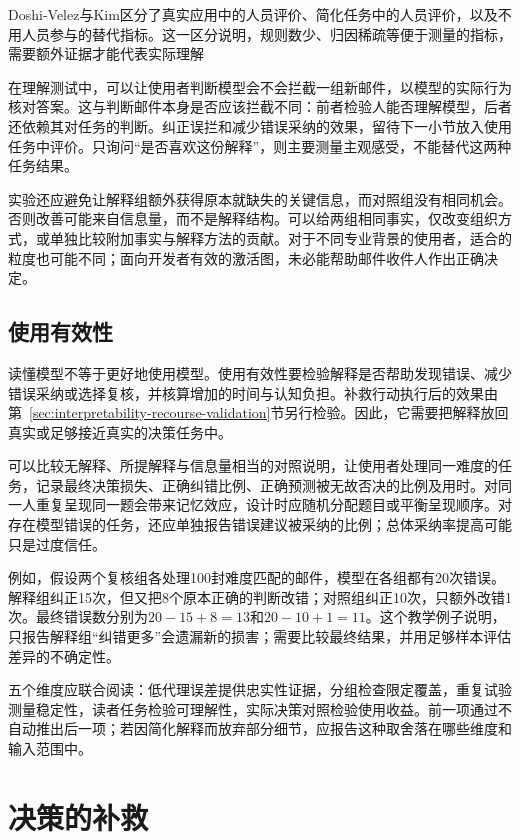 Doshi-Velez与Kim区分了真实应用中的人员评价、简化任务中的人员评价，以及不用人员参与的替代指标。这一区分说明，规则数少、归因稀疏等便于测量的指标，需要额外证据才能代表实际理解

在理解测试中，可以让使用者判断模型会不会拦截一组新邮件，以模型的实际行为核对答案。这与判断邮件本身是否应该拦截不同：前者检验人能否理解模型，后者还依赖其对任务的判断。纠正误拦和减少错误采纳的效果，留待下一小节放入使用任务中评价。只询问“是否喜欢这份解释”，则主要测量主观感受，不能替代这两种任务结果。

实验还应避免让解释组额外获得原本就缺失的关键信息，而对照组没有相同机会。否则改善可能来自信息量，而不是解释结构。可以给两组相同事实，仅改变组织方式，或单独比较附加事实与解释方法的贡献。对于不同专业背景的使用者，适合的粒度也可能不同；面向开发者有效的激活图，未必能帮助邮件收件人作出正确决定。

\subsection{使用有效性}
\label{sec:interpretability-quality-utility}

读懂模型不等于更好地使用模型。使用有效性要检验解释是否帮助发现错误、减少错误采纳或选择复核，并核算增加的时间与认知负担。补救行动执行后的效果由第~\ref{sec:interpretability-recourse-validation}节另行检验。因此，它需要把解释放回真实或足够接近真实的决策任务中。

可以比较无解释、所提解释与信息量相当的对照说明，让使用者处理同一难度的任务，记录最终决策损失、正确纠错比例、正确预测被无故否决的比例及用时。对同一人重复呈现同一题会带来记忆效应，设计时应随机分配题目或平衡呈现顺序。对存在模型错误的任务，还应单独报告错误建议被采纳的比例；总体采纳率提高可能只是过度信任。

例如，假设两个复核组各处理100封难度匹配的邮件，模型在各组都有20次错误。解释组纠正15次，但又把8个原本正确的判断改错；对照组纠正10次，只额外改错1次。最终错误数分别为$20-15+8=13$和$20-10+1=11$。这个教学例子说明，只报告解释组“纠错更多”会遗漏新的损害；需要比较最终结果，并用足够样本评估差异的不确定性。

五个维度应联合阅读：低代理误差提供忠实性证据，分组检查限定覆盖，重复试验测量稳定性，读者任务检验可理解性，实际决策对照检验使用收益。前一项通过不自动推出后一项；若因简化解释而放弃部分细节，应报告这种取舍落在哪些维度和输入范围中。

\section{决策的补救}
\label{sec:interpretability-recourse}

